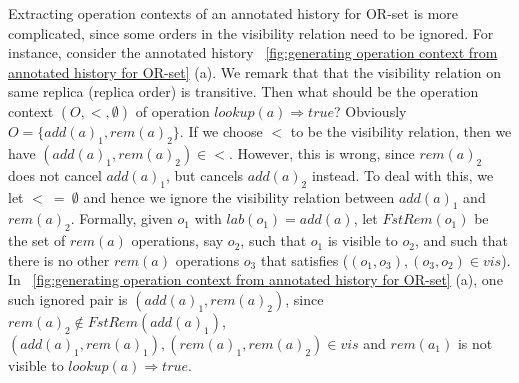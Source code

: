 \begin{remark}
  \label{remark: operation context of OR-set} Extracting
  operation contexts of an annotated history for OR-set is more
  complicated, since some orders in the visibility relation need to
  be ignored. For instance, consider the annotated history
  \figurename~\ref{fig:generating operation context from annotated
    history for OR-set} (a). We remark that that the visibility
  relation on same replica (replica order) is transitive.
  Then what should be the operation context $(O,<,\emptyset)$ of
  operation $\mathit{lookup}(a) \Rightarrow \mathit{true}$?
  Obviously $O = \{ \mathit{add}(a)_1, \mathit{rem}(a)_2 \}$. If we
  choose $<$ to be the visibility relation, then we have
  $(\mathit{add}(a)_1, \mathit{rem}(a)_2) \in <$. However, this is
  wrong, since $\mathit{rem}(a)_2$ does not cancel
  $\mathit{add}(a)_1$, but cancels $\mathit{add}(a)_2$ instead. To
  deal with this, we let $<\ =\ \emptyset$ and hence we ignore the
  visibility relation between $\mathit{add}(a)_1$ and
  $\mathit{rem}(a)_2$. Formally, given $o_1$ with $\mathit{lab}(o_1)
  = \mathit{add}(a)$, let $\mathit{FstRem}(o_1)$ be the set of
  $\mathit{rem}(a)$ operations, say $o_2$, such that $o_1$ is visible to
  $o_2$, and such that there is no other $\mathit{rem}(a)$ operations $o_3$ that
  satisfies ($(o_1,o_3),(o_3,o_2) \in \mathit{vis}$).
  In \figurename~\ref{fig:generating
    operation context from annotated history for OR-set} (a), one
  such ignored pair is $(\mathit{add}(a)_1,\mathit{rem}(a)_2)$, since
  $\mathit{rem}(a)_2 \notin \mathit{FstRem}(\mathit{add}(a)_1)$,
  $(\mathit{add}(a)_1,\mathit{rem}(a)_1),
  (\mathit{rem}(a)_1,\mathit{rem}(a)_2) \in \mathit{vis}$ and
  $\mathit{rem}(a_1)$ is not visible to $\mathit{lookup}(a)
  \Rightarrow \mathit{true}$.
\end{remark}


